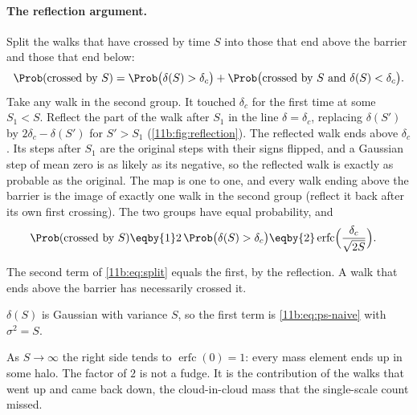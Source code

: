\paragraph{The reflection argument.}
Split the walks that have crossed by time $S$ into those that end above the
barrier and those that end below:
\begin{equation}
  \Prob(\text{crossed by }S)
  =\Prob\bigl(\delta(S)>\delta_c\bigr)
  +\Prob\bigl(\text{crossed by }S\text{ and }\delta(S)<\delta_c\bigr).
  \label{11b:eq:split}
\end{equation}
Take any walk in the second group. It touched $\delta_c$ for the first time at
some $S_1<S$. Reflect the part of the walk after $S_1$ in the line
$\delta=\delta_c$, replacing $\delta(S')$ by $2\delta_c-\delta(S')$ for
$S'>S_1$ (\cref{11b:fig:reflection}). The reflected walk ends above $\delta_c$.
Its steps after $S_1$ are the original steps with their signs flipped, and a
Gaussian step of mean zero is as likely as its negative, so the reflected walk is
exactly as probable as the original. The map is one to one, and every walk ending
above the barrier is the image of exactly one walk in the second group (reflect it
back after its own first crossing). The two groups have equal probability, and
\begin{align}
  \Prob(\text{crossed by }S)
  &\eqby{1}2\,\Prob\bigl(\delta(S)>\delta_c\bigr)
   \eqby{2}\operatorname{erfc}\Bigl(\frac{\delta_c}{\sqrt{2S}}\Bigr).
  \label{11b:eq:reflection}
\end{align}
\begin{explain}
  \item The second term of \eqref{11b:eq:split} equals the first, by the
        reflection. A walk that ends above the barrier has necessarily crossed it.
  \item $\delta(S)$ is Gaussian with variance $S$, so the first term is
        \eqref{11b:eq:ps-naive} with $\sigma^2=S$.
\end{explain}
As $S\to\infty$ the right side tends to $\operatorname{erfc}(0)=1$: every mass
element ends up in some halo. The factor of $2$ is not a fudge. It is the
contribution of the walks that went up and came back down, the cloud-in-cloud
mass that the single-scale count missed.

